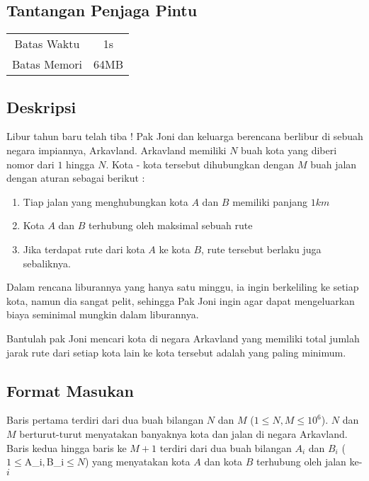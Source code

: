 \documentclass{article}
\begin{document}
\begin{center}
    \section*{Tantangan Penjaga Pintu} %

    \begin{tabular}{ | c c | }
        \hline
        Batas Waktu  & 1s \\    %
        Batas Memori & 64MB \\  %
        \hline
    \end{tabular}
\end{center}

\subsection*{Deskripsi}

Libur tahun baru telah tiba ! Pak Joni dan keluarga berencana berlibur di sebuah negara impiannya, Arkavland.
Arkavland memiliki $N$ buah kota yang diberi nomor dari $1$ hingga $N$. Kota - kota tersebut dihubungkan dengan $M$ buah jalan dengan aturan sebagai berikut :

\begin{enumerate}
    \setlength\itemsep{0pt}
    \item Tiap jalan yang menghubungkan kota $A$ dan $B$ memiliki panjang $1 km$
    \item Kota $A$ dan $B$ terhubung oleh maksimal sebuah rute 
    \item Jika terdapat rute dari kota $A$ ke kota $B$, rute tersebut berlaku juga sebaliknya.
\end{enumerate}

Dalam rencana liburannya yang hanya satu minggu, ia ingin berkeliling ke setiap kota, namun dia sangat pelit, sehingga Pak Joni ingin agar dapat mengeluarkan biaya seminimal mungkin dalam liburannya. 

Bantulah pak Joni mencari kota di negara Arkavland yang memiliki total jumlah jarak rute dari setiap kota lain ke kota tersebut adalah yang paling minimum.

\subsection*{Format Masukan}
Baris pertama terdiri dari dua buah bilangan $N$ dan $M$ ($1 \leq N,M \leq 10^{6}$). $N$ dan $M$ berturut-turut menyatakan banyaknya kota dan jalan di negara Arkavland.
Baris kedua hingga baris ke $M + 1$ terdiri dari dua buah bilangan $A_i$ dan $B_i$ ($1 \leq $A_i$,$B_i$ \leq N$) yang menyatakan kota $A$ dan kota $B$ terhubung oleh jalan ke-$i$
\end{document}
